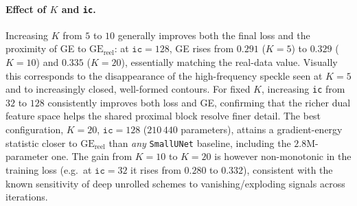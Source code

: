 
\paragraph{Effect of $K$ and \texttt{ic}.} Increasing $K$ from $5$ to $10$
generally improves both the final loss and the proximity of GE to
$\mathrm{GE}_{\text{reel}}$: at $\texttt{ic}=128$, GE rises from $0.291$ ($K=5$)
to $0.329$ ($K=10$) and $0.335$ ($K=20$), essentially matching the real-data
value. Visually this corresponds to the disappearance of the high-frequency
speckle seen at $K=5$ and to increasingly closed, well-formed contours. For fixed
$K$, increasing \texttt{ic} from $32$ to $128$ consistently improves both loss
and GE, confirming that the richer dual feature space helps the shared proximal
block resolve finer detail. The best configuration, $K=20$, $\texttt{ic}=128$
($210\,440$ parameters), attains a gradient-energy statistic closer to
$\mathrm{GE}_{\text{reel}}$ than \emph{any} \texttt{SmallUNet} baseline, including
the $2.8$M-parameter one. The gain from $K=10$ to $K=20$ is however
non-monotonic in the training loss (e.g.\ at $\texttt{ic}=32$ it rises from
$0.280$ to $0.332$), consistent with the known sensitivity of deep unrolled
schemes to vanishing/exploding signals across iterations.

